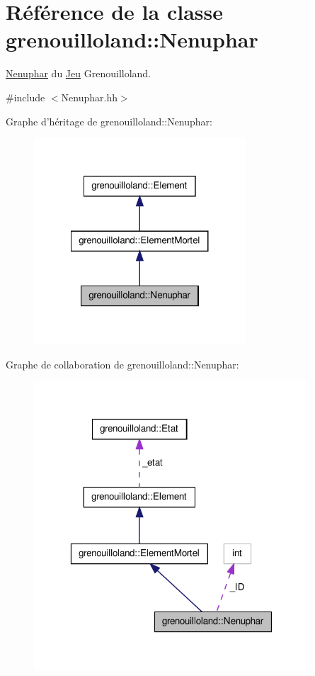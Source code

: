 \hypertarget{classgrenouilloland_1_1Nenuphar}{\section{Référence de la classe grenouilloland\-:\-:Nenuphar}
\label{classgrenouilloland_1_1Nenuphar}
}


\hyperlink{classgrenouilloland_1_1Nenuphar}{Nenuphar} du \hyperlink{classgrenouilloland_1_1Jeu}{Jeu} Grenouilloland.  




{\ttfamily \#include $<$Nenuphar.\-hh$>$}



Graphe d'héritage de grenouilloland\-:\-:Nenuphar\-:
\nopagebreak
\begin{figure}[H]
\begin{center}
\leavevmode
\includegraphics[width=224pt]{classgrenouilloland_1_1Nenuphar__inherit__graph}
\end{center}
\end{figure}


Graphe de collaboration de grenouilloland\-:\-:Nenuphar\-:
\nopagebreak
\begin{figure}[H]
\begin{center}
\leavevmode
\includegraphics[width=292pt]{classgrenouilloland_1_1Nenuphar__coll__graph}
\end{center}
\end{figure}
